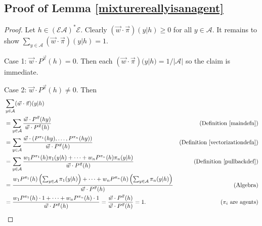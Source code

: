 \documentclass[twoside]{article}
\begin{document}
\subsection{Proof of Lemma \ref{mixturereallyisanagent}}
\begin{proof}
    Let $h\in(\mathcal E\mathcal A)^*\mathcal E$.
    Clearly $(\vec w\cdot\vec\pi)(y|h)\geq 0$ for all $y\in\mathcal A$.
    It remains to show
    $\sum_{y\in\mathcal A}(\vec w\cdot\vec\pi)(y|h)=1$.

    Case 1: $\vec w\cdot {P^{\vec\pi}}(h)=0$. Then
    each $(\vec w\cdot\vec\pi)(y|h)=1/|\mathcal A|$ so the
    claim is immediate.

    Case 2: $\vec w\cdot {P^{\vec\pi}}(h)\not=0$. Then
    \begin{align*}
        &{} \sum_{y\in\mathcal A}(\vec w\cdot\vec\pi)(y|h)\\
            &= \sum_{y\in\mathcal A}
                \frac{\vec w\cdot {P^{\vec\pi}}(hy)}{\vec w\cdot {P^{\vec\pi}}(h)}
                &\mbox{(Definition \ref{maindefn})}\\
            &= \sum_{y\in\mathcal A}
                \frac
                {\vec w\cdot(P^{\pi_1}(hy),\ldots,P^{\pi_n}(hy))}
                {\vec w\cdot {P^{\vec\pi}}(h)}
                &\mbox{(Definition \ref{vectorizationdefn})}\\
            &= \sum_{y\in\mathcal A}
                \frac
                {w_1 P^{\pi_1}(h)\pi_1(y|h)+\cdots+w_n P^{\pi_n}(h)\pi_n(y|h)}
                {\vec w\cdot {P^{\vec\pi}}(h)}
                &\mbox{(Definition \ref{pullbackdef})}\\
            &= \frac{
                w_1 P^{\pi_1}(h)\left(\mbox{$\sum_{y\in\mathcal A}\pi_1(y|h)$}\right)
                +\cdots+
                w_n P^{\pi_n}(h)\left(\mbox{$\sum_{y\in\mathcal A}\pi_n(y|h)$}\right)
                }
                {\vec w\cdot {P^{\vec\pi}}(h)}
                &\mbox{(Algebra)}\\
            &= \frac
                {w_1 P^{\pi_1}(h)\cdot 1 + \cdots + w_n P^{\pi_n}(h)\cdot1}
                {\vec w\cdot {P^{\vec\pi}}(h)}
                =\frac{\vec w\cdot {P^{\vec\pi}}(h)}{\vec w\cdot {P^{\vec\pi}}(h)}=1.
                &\mbox{($\pi_i$ are agents)}
    \end{align*}
\end{proof}
\end{document}
